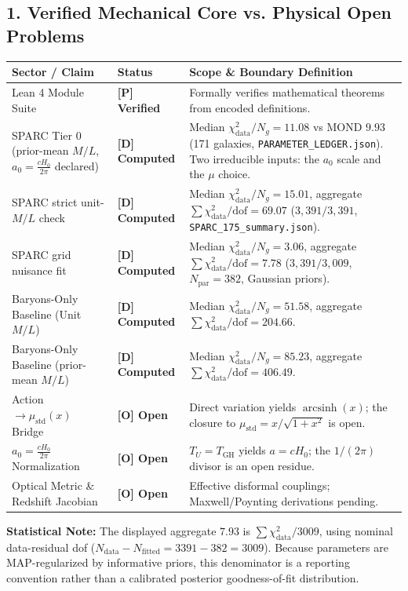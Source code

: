 \documentclass[10pt,letterpaper]{article}
\begin{document}
\vspace{0.3em}

\subsection*{1. Verified Mechanical Core vs. Physical Open Problems}

\begin{table}[h!]
\centering
\footnotesize
\begin{tabularx}{\textwidth}{@{}l l X@{}}
\toprule
\textbf{Sector / Claim} & \textbf{Status} & \textbf{Scope \& Boundary Definition} \\ \midrule
Lean 4 Module Suite & \textbf{[P] Verified} & Formally verifies mathematical theorems from encoded definitions. \\
SPARC Tier 0 (prior-mean $M/L$, $a_0=\frac{cH_0}{2\pi}$ declared) & \textbf{[D] Computed} & Median $\chi^2_{\text{data}}/N_g = 11.08$ vs MOND $9.93$ (171 galaxies, \texttt{PARAMETER\_LEDGER.json}). Two irreducible inputs: the $a_0$ scale and the $\mu$ choice. \\
SPARC strict unit-$M/L$ check & \textbf{[D] Computed} & Median $\chi^2_{\text{data}}/N_g = 15.01$, aggregate $\sum\chi^2_{\text{data}}/\text{dof} = 69.07$ ($3,391 / 3,391$, \texttt{SPARC\_175\_summary.json}). \\
SPARC grid nuisance fit & \textbf{[D] Computed} & Median $\chi^2_{\text{data}}/N_g = 3.06$, aggregate $\sum\chi^2_{\text{data}}/\text{dof} = 7.78$ ($3,391 / 3,009$, $N_{\text{par}}=382$, Gaussian priors). \\
Baryons-Only Baseline (Unit $M/L$) & \textbf{[D] Computed} & Median $\chi^2_{\text{data}}/N_g = 51.58$, aggregate $\sum\chi^2_{\text{data}}/\text{dof} = 204.66$. \\
Baryons-Only Baseline (prior-mean $M/L$) & \textbf{[D] Computed} & Median $\chi^2_{\text{data}}/N_g = 85.23$, aggregate $\sum\chi^2_{\text{data}}/\text{dof} = 406.49$. \\
Action $\to \mu_{\text{std}}(x)$ Bridge & \textbf{[O] Open} & Direct variation yields $\operatorname{arcsinh}(x)$; the closure to $\mu_{\text{std}} = x/\sqrt{1+x^2}$ is open. \\
$a_0 = \frac{cH_0}{2\pi}$ Normalization & \textbf{[O] Open} & $T_U = T_{\text{GH}}$ yields $a = cH_0$; the $1/(2\pi)$ divisor is an open residue. \\
Optical Metric \& Redshift Jacobian & \textbf{[O] Open} & Effective disformal couplings; Maxwell/Poynting derivations pending. \\ \bottomrule
\end{tabularx}
\vspace{0.2em}
\scriptsize \textbf{Statistical Note:} The displayed aggregate $7.93$ is $\sum\chi^2_{\text{data}}/3009$, using nominal data-residual dof ($N_{\text{data}} - N_{\text{fitted}} = 3391 - 382 = 3009$). Because parameters are MAP-regularized by informative priors, this denominator is a reporting convention rather than a calibrated posterior goodness-of-fit distribution.
\end{table}
\end{document}
